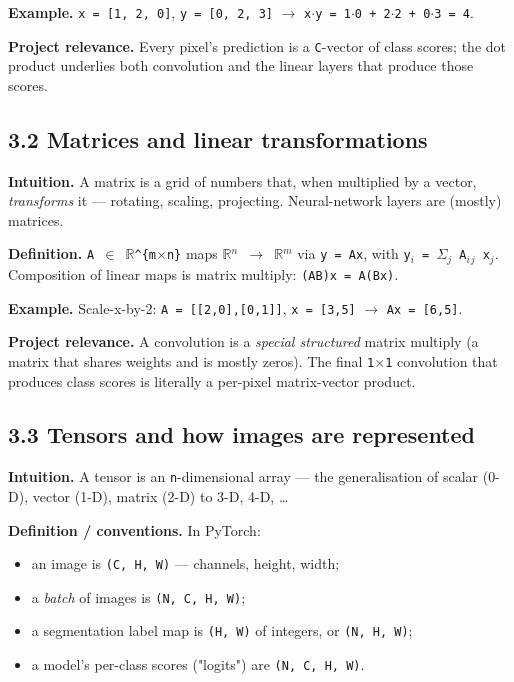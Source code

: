 \documentclass[11pt]{article}
\begin{document}
\textbf{Example.} \texttt{x = [1, 2, 0]}, \texttt{y = [0, 2, 3]} $\rightarrow$ \texttt{x$\cdot$y = 1$\cdot$0 + 2$\cdot$2 + 0$\cdot$3 = 4}.

\textbf{Project relevance.} Every pixel's prediction is a \texttt{C}-vector of class scores; the dot product underlies both convolution and the linear layers that produce those scores.

\subsection*{3.2 Matrices and linear transformations}

\textbf{Intuition.} A matrix is a grid of numbers that, when multiplied by a vector, \textit{transforms} it --- rotating, scaling, projecting. Neural-network layers are (mostly) matrices.

\textbf{Definition.} \texttt{A $\in$ $\mathbb{R}$\textasciicircum{}\{m$\times$n\}} maps \texttt{$\mathbb{R}$$^{n}$ $\rightarrow$ $\mathbb{R}$$^{m}$} via \texttt{y = Ax}, with \texttt{y$_{i}$ = $\Sigma$$_{j}$ A$_{i}$$_{j}$ x$_{j}$}. Composition of linear maps is matrix multiply: \texttt{(AB)x = A(Bx)}.

\textbf{Example.} Scale-x-by-2: \texttt{A = [[2,0],[0,1]]}, \texttt{x = [3,5]} $\rightarrow$ \texttt{Ax = [6,5]}.

\textbf{Project relevance.} A convolution is a \textit{special structured} matrix multiply (a matrix that shares weights and is mostly zeros). The final \texttt{1$\times$1} convolution that produces class scores is literally a per-pixel matrix-vector product.

\subsection*{3.3 Tensors and how images are represented}

\textbf{Intuition.} A tensor is an \texttt{n}-dimensional array --- the generalisation of scalar (0-D), vector (1-D), matrix (2-D) to 3-D, 4-D, \ldots{}

\textbf{Definition / conventions.} In PyTorch:
\begin{itemize}\setlength{\itemsep}{1pt}
\item an image is \texttt{(C, H, W)} --- channels, height, width;
\item a \textit{batch} of images is \texttt{(N, C, H, W)};
\item a segmentation label map is \texttt{(H, W)} of integers, or \texttt{(N, H, W)};
\item a model's per-class scores ("logits") are \texttt{(N, C, H, W)}.
\end{itemize}
\end{document}
